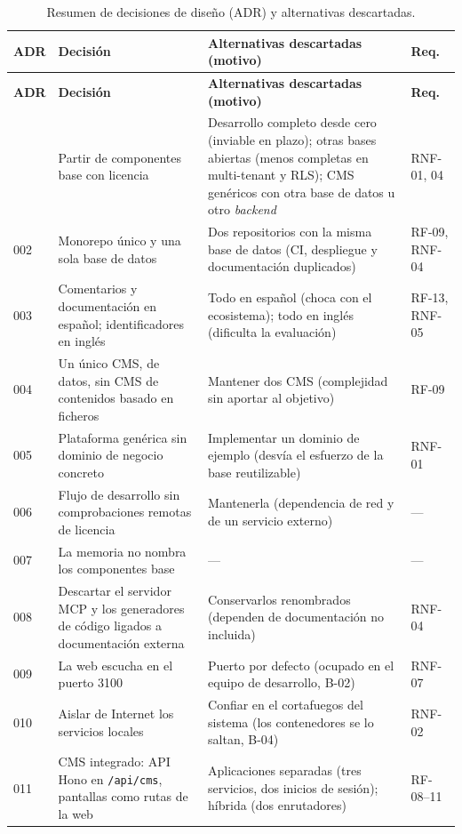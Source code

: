 \begin{longtable}{@{}l>{\raggedright\arraybackslash}p{4.3cm}>{\raggedright\arraybackslash}p{5.6cm}>{\raggedright\arraybackslash}p{2.4cm}@{}}
  \caption{Resumen de decisiones de diseño (ADR) y alternativas descartadas.}\label{tab:dis-adr}\\
  \toprule
  \textbf{ADR} & \textbf{Decisión} & \textbf{Alternativas descartadas (motivo)} & \textbf{Req.} \\
  \midrule
  \endfirsthead
  \toprule
  \textbf{ADR} & \textbf{Decisión} & \textbf{Alternativas descartadas (motivo)} & \textbf{Req.} \\
  \midrule
  \endhead
  \bottomrule
  \endfoot
  001 & Partir de componentes base con licencia
    & Desarrollo completo desde cero (inviable en plazo); otras bases abiertas (menos completas en multi-tenant y RLS); CMS genéricos con otra base de datos u otro \textit{backend} & RNF-01, 04 \\
  002 & Monorepo único y una sola base de datos & Dos repositorios con la misma base de datos (CI, despliegue y documentación duplicados) & RF-09, RNF-04 \\
  003 & Comentarios y documentación en español; identificadores en inglés & Todo en español (choca con el ecosistema); todo en inglés (dificulta la evaluación) & RF-13, RNF-05 \\
  004 & Un único CMS, de datos, sin CMS de contenidos basado en ficheros & Mantener dos CMS (complejidad sin aportar al objetivo) & RF-09 \\
  005 & Plataforma genérica sin dominio de negocio concreto & Implementar un dominio de ejemplo (desvía el esfuerzo de la base reutilizable) & RNF-01 \\
  006 & Flujo de desarrollo sin comprobaciones remotas de licencia & Mantenerla (dependencia de red y de un servicio externo) & --- \\
  007 & La memoria no nombra los componentes base & --- & --- \\
  008 & Descartar el servidor MCP y los generadores de código ligados a documentación externa & Conservarlos renombrados (dependen de documentación no incluida) & RNF-04 \\
  009 & La web escucha en el puerto 3100 & Puerto por defecto (ocupado en el equipo de desarrollo, B-02) & RNF-07 \\
  010 & Aislar de Internet los servicios locales & Confiar en el cortafuegos del sistema (los contenedores se lo saltan, B-04) & RNF-02 \\
  011 & CMS integrado: API Hono en \texttt{/api/cms}, pantallas como rutas de la web & Aplicaciones separadas (tres servicios, dos inicios de sesión); híbrida (dos enrutadores) & RF-08--11 \\

\end{longtable}
